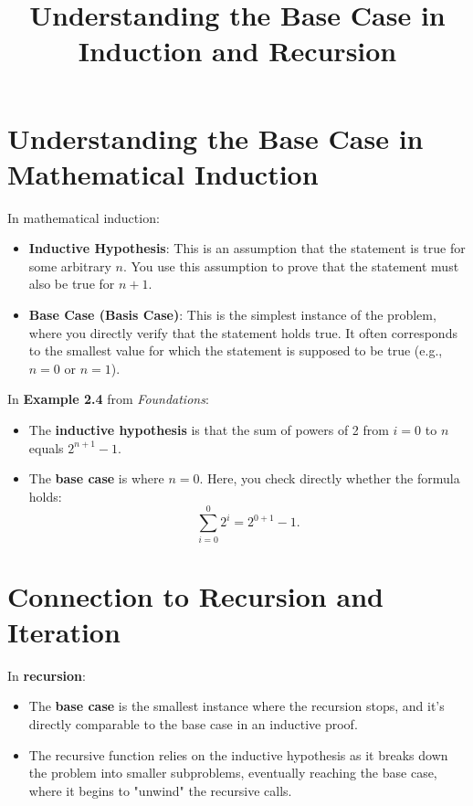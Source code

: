 \documentclass{article}
\title{Understanding the Base Case in Induction and Recursion}
\author{}
\date{}
\begin{document}
\maketitle

\section{Understanding the Base Case in Mathematical Induction}

In mathematical induction:

\begin{itemize}
    \item \textbf{Inductive Hypothesis}: This is an assumption that the statement is true for some arbitrary \( n \). You use this assumption to prove that the statement must also be true for \( n + 1 \).
    \item \textbf{Base Case (Basis Case)}: This is the simplest instance of the problem, where you directly verify that the statement holds true. It often corresponds to the smallest value for which the statement is supposed to be true (e.g., \( n = 0 \) or \( n = 1 \)).
\end{itemize}

In \textbf{Example 2.4} from \textit{Foundations}:

\begin{itemize}
    \item The \textbf{inductive hypothesis} is that the sum of powers of 2 from \( i = 0 \) to \( n \) equals \( 2^{n+1} - 1 \).
    \item The \textbf{base case} is where \( n = 0 \). Here, you check directly whether the formula holds: 
    \[
    \sum_{i=0}^{0} 2^i = 2^{0+1} - 1.
    \]
\end{itemize}

\section{Connection to Recursion and Iteration}

In \textbf{recursion}:

\begin{itemize}
    \item The \textbf{base case} is the smallest instance where the recursion stops, and it's directly comparable to the base case in an inductive proof.
    \item The recursive function relies on the inductive hypothesis as it breaks down the problem into smaller subproblems, eventually reaching the base case, where it begins to "unwind" the recursive calls.
\end{itemize}
\end{document}
